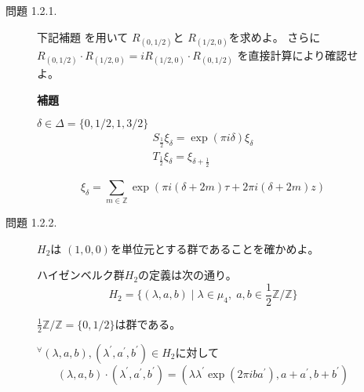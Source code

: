 \documentclass[12pt,b5paper]{ltjsarticle}
\begin{document}
\begin{description}
\begin{description}
\hrulefill

  \item[問題 1.2.1.]
             下記補題
             を用いて
             $R_{(0,1/2)}$と
             $R_{(1/2,0)}$を求めよ。
             さらに
             $R_{(0,1/2)}\cdot R_{(1/2,0)}=iR_{(1/2,0)}\cdot R_{(0,1/2)}$
             を直接計算により確認せよ。

             \textbf{補題}

             $\delta \in \Delta = \{0,1/2,1,3/2\}$
             \begin{gather}
              S_{\frac{1}{2}} \xi_{\delta} = \exp{(\pi i \delta)} \xi_{\delta}\\
              T_{\frac{1}{2}} \xi_{\delta} = \xi_{\delta + \frac{1}{2}}
             \end{gather}

\dotfill

\begin{equation}
 \xi_{\delta} = \sum_{m\in\mathbb{Z}} \exp{(\pi i(\delta+2m)\tau + 2\pi i(\delta+2m)z)}
\end{equation}



\hrulefill

  \item[問題 1.2.2.]
             $H_{2}$は
             $(1,0,0)$を単位元とする群であることを確かめよ。

\dotfill

ハイゼンベルク群$H_{2}$の定義は次の通り。
\begin{equation}
 H_{2}
  = \{ (\lambda,a,b) \mid \lambda\in\mu_{4},\;
  a,b\in\frac{1}{2}\mathbb{Z}/\mathbb{Z}\}
\end{equation}

$\frac{1}{2}\mathbb{Z}/\mathbb{Z}=\{0,1/2\}$は群である。

             ${}^{\forall}(\lambda,a,b),(\lambda^{\prime},a^{\prime},b^{\prime}) \in H_{2}$に対して
             \begin{equation}
              (\lambda,a,b)\cdot(\lambda^{\prime},a^{\prime},b^{\prime})
               =(\lambda\lambda^{\prime} \exp{(2\pi iba^{\prime})},a+a^{\prime},b+b^{\prime})
             \end{equation}




\hrulefill

 \end{description}


\end{description}
\end{document}
